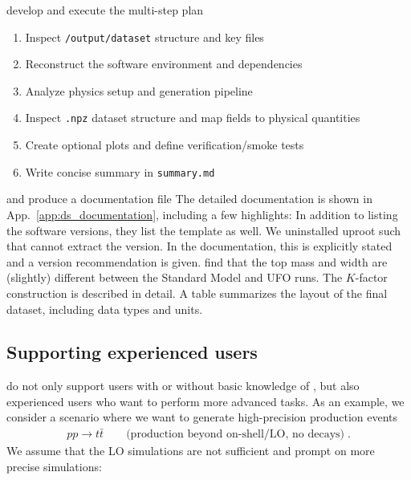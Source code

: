 \documentclass[submission, Phys]{SciPost}
\begin{document}
%
\ma develop and execute the multi-step plan
%
\begin{planblock}[Plan]
\begin{enumerate}[leftmargin=*, label=\textbf{Step \arabic*:}, itemsep=0.6em]
\item Inspect \lstinline|/output/dataset| structure and key files
\item Reconstruct the software environment and dependencies
\item Analyze physics setup and generation pipeline
\item Inspect \lstinline|.npz| dataset structure and map fields to physical quantities
\item Create optional plots and define verification/smoke tests
\item Write concise summary in \lstinline|summary.md|
\end{enumerate}
\end{planblock}
%
and produce a documentation file
%
%
The detailed documentation is shown in App.~\ref{app:ds_documentation}, including a few highlights: In addition to listing the software versions, they list the template as well. We uninstalled uproot such that \ma cannot extract the version. In the documentation, this is explicitly stated and a version recommendation is given. \ma find that the top mass and width are (slightly) different between the Standard Model and UFO runs. The $K$-factor construction is described in detail. A table summarizes the layout of the final dataset, including data types and units.

\clearpage
\subsection{Supporting experienced users}
\label{sec:apps_adv} 

\ma do not only support users with or without basic knowledge of \mg, but also experienced users who want to perform more advanced tasks. As an example, we consider a scenario where we want to generate high-precision production events  
%
\begin{align}
 pp \to t \bar{t} 
 \qquad \text{(production beyond on-shell/LO, no decays)} \; .
\end{align}
%
We assume that the LO simulations are not sufficient and prompt \ma on more precise simulations:
\end{document}
